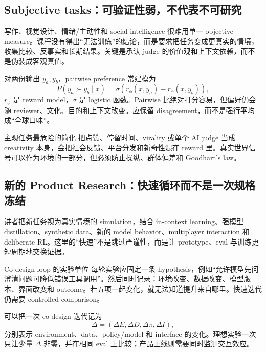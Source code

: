 \subsection{Subjective tasks：可验证性弱，不代表不可研究}

写作、视觉设计、情绪/主动性和 social intelligence 很难用单一 objective measure。课程没有得出“无法训练”的结论，而是要求把任务变成更真实的情境，收集比较、反事实和长期结果。关键是承认 judge 的价值观和上下文依赖，而不是伪装成客观真值。


对两份输出 $y_a,y_b$，pairwise preference 常建模为
\[
P(y_a\succ y_b\mid x)=\sigma\!\left(r_\phi(x,y_a)-r_\phi(x,y_b)\right),
\]
$r_\phi$ 是 reward model，$\sigma$ 是 logistic 函数。Pairwise 比绝对打分容易，但偏好仍会随 reviewer、文化、目的和上下文改变。应保留 disagreement，而不是强行平均成“全球口味”。

\begin{warningbox}{主观任务最危险的简化}
把点赞、停留时间、virality 或单个 AI judge 当成 creativity 本身，会把社会反馈、平台分发和新奇性混在 reward 里。真实世界信号可以作为环境的一部分，但必须防止操纵、群体偏差和 Goodhart's law。
\end{warningbox}

\subsection{新的 Product Research：快速循环而不是一次规格冻结}

讲者把新任务视为真实情境的 simulation，结合 in-context learning、强模型 distillation、synthetic data、新的 model behavior、multiplayer interaction 和 deliberate RL。这里的“快速”不是跳过严谨性，而是让 prototype、eval 与训练更短周期地交换证据。


\begin{importantbox}{Co-design loop 的实验单位}
每轮实验应固定一条 hypothesis，例如“允许模型先问澄清问题可降低错误工具调用”。然后同时记录：环境改变、数据改变、模型版本、界面改变和 outcome。若五项一起变化，就无法知道提升来自哪里。快速迭代仍需要 controlled comparison。
\end{importantbox}

可以把一次 co-design 迭代记为
\[
\Delta=(\Delta E,\Delta D,\Delta \pi,\Delta I),
\]
分别表示 environment、data、policy/model 和 interface 的变化。理想实验一次只让少量 $\Delta$ 非零，并在相同 eval 上比较；产品上线则需要同时监测交互效应。

